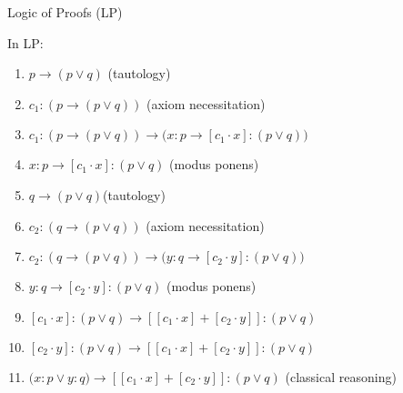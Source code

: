 \documentclass{beamer}
\theoremstyle{definition}
\newcommand{\ou}{\vee}
\newcommand{\impli}{\rightarrow}
\begin{document}
\begin{frame} {Logic of Proofs (LP)}

\vspace{5mm}
In LP:

\vspace{5mm}


\begin{enumerate}[1.]

\item $p \impli (p\ou q)$ (tautology)

\item $c_{1}$$:$$(p \impli (p\ou q))$ (axiom necessitation)

\item $c_{1}$$:$$(p \impli (p\ou q)) \impli (x$$:$$p \impli  [c_{1}\cdot x]$$:$$  
(p\ou q))$ 

\item $x$$:$$p \impli  [c_{1}\cdot x]$$:$$  
(p\ou q)$ (modus ponens) 


\item $q \impli (p\ou q)$(tautology)

\item $c_{2}$$:$$(q \impli (p\ou q))$ (axiom necessitation)

\item $c_{2}$$:$$(q \impli (p\ou q)) \impli (y$$:$$q \impli  [c_{2}\cdot y]$$:$$  
(p\ou q))$ 

\item $y$$:$$q \impli  [c_{2}\cdot y]$$:$$  
(p\ou q)$ (modus ponens) 


\item $[c_{1}\cdot x]$$:$$  
(p\ou q) \impli [[c_{1}\cdot x] + [c_{2}\cdot y]]$$:$$  
(p\ou q)$ 

\item $[c_{2}\cdot y]$$:$$  
(p\ou q) \impli [[c_{1}\cdot x] + [c_{2}\cdot y]]$$:$$  
(p\ou q)$ 


\item $(x$$:$$ p \ou y$$:$$ q ) \impli [[c_{1}\cdot x] + [c_{2}\cdot y]]$$:$$  
(p\ou q)$ (classical reasoning)
\end{enumerate}
\end{frame}
\end{document}
